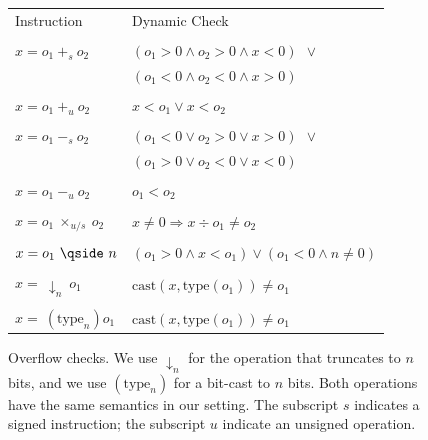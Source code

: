 \documentclass[preprint]{sigplanconf}[10pt]
\begin{document}
\begin{figure}[t!]
\begin{center}
\begin{tabular}{ll}
Instruction & Dynamic Check \\ \\
$x = o_1 \ +_s \ o_2$ & $(o_1 > 0 \wedge o_2 > 0 \wedge x < 0) \ \ \vee$ \\
                      & $(o_1 < 0 \wedge o_2 < 0 \wedge x > 0)$ \\ \\
$x = o_1 \ +_u \ o_2$ & $x < o_1 \vee x < o_2$ \\ \\
$x = o_1 \ -_s \ o_2$ & $(o_1 < 0 \vee o_2 > 0 \vee x > 0) \ \ \vee$ \\
                      & $(o_1 > 0 \vee o_2 < 0 \vee x < 0)$ \\ \\
$x = o_1 \ -_u \ o_2$ & $o_1 < o_2$ \\ \\
$x = o_1 \ \times_{u/s} \ o_2$ & $x \neq 0 \Rightarrow x \div o_1 \neq o_2$ \\ \\
$x = o_1 \ \qside \ n$ & $(o_1 > 0 \wedge x < o_1) \vee (o_1 < 0 \wedge n \neq 0)$ \\ \\
$x = \ \downarrow_n \ o_1$ & $\mbox{cast}(x, \mbox{type}(o_1)) \neq o_1$ \\ \\
$x = \ (\mbox{type}_n) o_1$ & $\mbox{cast}(x, \mbox{type}(o_1)) \neq o_1$ \\
\end{tabular}
\end{center}
\caption{\label{fig:instrumentation}Overflow checks. We use $\downarrow_n$ for
the operation that truncates to $n$ bits, and we use $(\mbox{type}_n)$ for a
bit-cast to $n$ bits. Both operations have the same semantics in our setting.
The subscript $s$ indicates a signed instruction; the subscript $u$ indicate
an unsigned operation.}
\end{figure}
\end{document}
